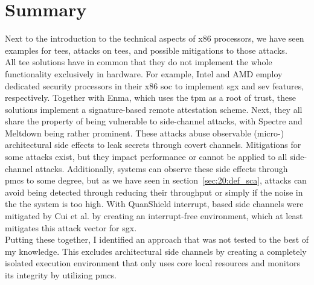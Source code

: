 \section{Summary}
Next to the introduction to the technical aspects of x86 processors, we have seen
examples for \glspl{tee}, attacks on \glspl{tee}, and possible mitigations to
those attacks. \\

All \gls{tee} solutions have in common that they do not implement the whole
functionality exclusively in hardware. For example, Intel and AMD employ
dedicated security processors in their x86 \gls{soc} to implement \gls{sgx} and
\gls{sev} features, respectively. Together with Enma, which uses the \gls{tpm}
as a root of trust, these solutions implement a signature-based remote
attestation scheme. Next, they all share the property of being vulnerable to
side-channel attacks, with Spectre and Meltdown being rather prominent. These
attacks abuse observable (micro-) architectural side effects to leak secrets
through covert channels. Mitigations for some attacks exist, but they impact
performance or cannot be applied to all side-channel attacks. Additionally,
systems can observe these side effects through \glspl{pmc} to some degree, but
as we have seen in section~\ref{sec:20:def_sca}, attacks can avoid being
detected through reducing their throughput or simply if the noise in the the
system is too high. With QuanShield interrupt, based side channels were
mitigated by Cui et al. by creating an interrupt-free environment, which at
least mitigates this attack vector for \gls{sgx}.\\

Putting these together, I identified an approach that was not tested to the best
of my knowledge. This excludes architectural side channels by creating a
completely isolated execution environment that only uses core local resources
and monitors its integrity by utilizing \glspl{pmc}.
